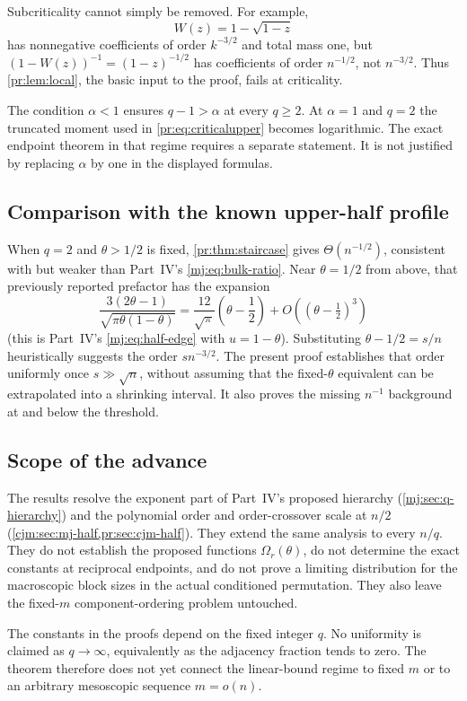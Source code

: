 \documentclass[11pt,a4paper]{article}
\theoremstyle{definition}\newaliascnt{definition}{theorem}
\theoremstyle{remark}\newaliascnt{remark}{theorem}
\begin{document}
Subcriticality cannot simply be removed. For example,
\[
 W(z)=1-\sqrt{1-z}
\]
has nonnegative coefficients of order $k^{-3/2}$ and total mass one, but
$(1-W(z))^{-1}=(1-z)^{-1/2}$ has coefficients of order $n^{-1/2}$, not
$n^{-3/2}$. Thus \cref{pr:lem:local}, the basic input to the proof, fails at
criticality.

The condition $\alpha<1$ ensures $q-1>\alpha$ at every $q\ge2$. At
$\alpha=1$ and $q=2$ the truncated moment used in \eqref{pr:eq:criticalupper}
becomes logarithmic. The exact endpoint theorem in that regime requires a
separate statement. It is not justified by replacing $\alpha$ by one in the
displayed formulas.

\subsection{Comparison with the known upper-half profile}
When $q=2$ and $\theta>1/2$ is fixed, \cref{pr:thm:staircase} gives
$\Theta(n^{-1/2})$, consistent with but weaker than Part~IV's
\eqref{mj:eq:bulk-ratio}. Near $\theta=1/2$ from above, that previously
reported prefactor has the expansion
\[
 \frac{3(2\theta-1)}{\sqrt{\pi\theta(1-\theta)}}
 =\frac{12}{\sqrt\pi}\left(\theta-\frac12\right)
   +O\!\left((\theta-\tfrac12)^3\right)
\]
(this is Part~IV's \eqref{mj:eq:half-edge} with $u=1-\theta$). Substituting
$\theta-1/2=s/n$ heuristically suggests the order $s n^{-3/2}$. The present
proof establishes that order uniformly once $s\gg\sqrt n$, without assuming
that the fixed-$\theta$ equivalent can be extrapolated into a shrinking
interval. It also proves the missing $n^{-1}$ background at and below the
threshold.

\subsection{Scope of the advance}
\label{pr:sec:scope}
The results resolve the exponent part of Part~IV's proposed hierarchy
(\cref{mj:sec:q-hierarchy}) and the polynomial order and order-crossover
scale at $n/2$ (\cref{cjm:sec:mj-half,pr:sec:cjm-half}). They extend the
same analysis to every $n/q$. They do not establish the proposed functions
$\Omega_r(\theta)$, do not determine the exact constants at reciprocal
endpoints, and do not prove a limiting distribution for the macroscopic
block sizes in the actual conditioned permutation. They also leave the
fixed-$m$ component-ordering problem untouched.

The constants in the proofs depend on the fixed integer $q$. No uniformity
is claimed as $q\to\infty$, equivalently as the adjacency fraction tends to
zero. The theorem therefore does not yet connect the linear-bound regime to
fixed $m$ or to an arbitrary mesoscopic sequence $m=o(n)$.
\end{document}
